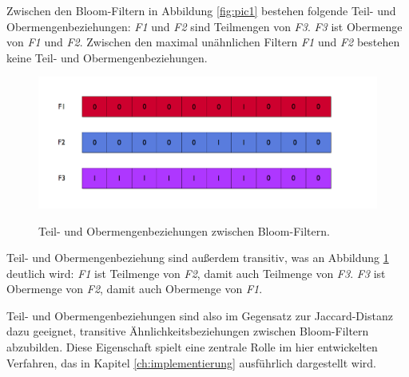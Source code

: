 Zwischen den Bloom-Filtern in Abbildung \ref{fig:pic1} bestehen folgende Teil- und Obermengenbeziehungen: \textit{F1} und \textit{F2} sind Teilmengen von \textit{F3}. \textit{F3} ist Obermenge von \textit{F1} und \textit{F2}. Zwischen den maximal unähnlichen Filtern \textit{F1} und \textit{F2} bestehen keine Teil- und Obermengenbeziehungen. 
\begin{figure}[hpbt]
  \centering
  \includegraphics[width=1.0\textwidth]{pictures/distances.png}\\
  \caption[Teil- und Obermengenbeziehungen zwischen Bloom-Filtern]{Teil- und Obermengenbeziehungen zwischen Bloom-Filtern.}\label{fig:pic2}
\end{figure}

\noindent
Teil- und Obermengenbeziehung sind außerdem transitiv, was an Abbildung \ref{fig:pic2} deutlich wird: \textit{F1} ist Teilmenge von \textit{F2}, damit auch Teilmenge von \textit{F3}. \textit{F3} ist Obermenge von \textit{F2}, damit auch Obermenge von \textit{F1}. 

Teil- und Obermengenbeziehungen sind also im Gegensatz zur Jaccard-Distanz dazu geeignet, transitive Ähnlichkeitsbeziehungen zwischen Bloom-Filtern abzubilden. Diese Eigenschaft spielt eine zentrale Rolle im hier entwickelten Verfahren, das in Kapitel \ref{ch:implementierung} ausführlich dargestellt wird. 
